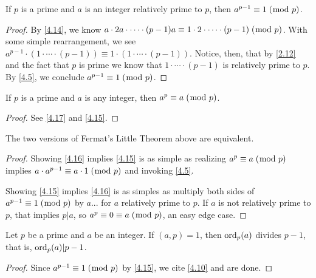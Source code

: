 \documentclass[../main.tex]{subfiles}
\begin{document}
\begin{thm} \label{4.15}
  If $p$ is a prime and $a$ is an integer relatively prime to $p$, then $a^{p-1} \equiv 1 \; (\bmod \; p)$.
\end{thm}

\begin{proof}
  By \ref{4.14}, we know $a \cdot 2a \cdot \cdots \cdot (p-1)a \equiv 1 \cdot 2 \cdot \cdots \cdot (p-1) \; (\bmod \; p)$. With some simple rearrangement, we see $a^{p-1} \cdot (1 \cdot \cdots \cdot (p-1)) \equiv 1 \cdot (1 \cdot \cdots \cdot (p-1))$.
  Notice, then, that by \ref{2.12} and the fact that $p$ is prime we know that $1 \cdot \cdots \cdot (p-1)$ is relatively prime to $p$. By \ref{4.5}, we conclude $a^{p-1} \equiv 1 \; (\bmod \; p)$.
\end{proof}



\begin{thm} \label{4.16}
  If $p$ is a prime and $a$ is any integer, then $a^p \equiv a \; (\bmod \; p)$.
\end{thm}

\begin{proof}
  See \ref{4.17} and \ref{4.15}.
\end{proof}



\pagebreak



\begin{thm} \label{4.17}
  The two versions of Fermat's Little Theorem above are equivalent.
\end{thm}

\begin{proof}
  Showing \ref{4.16} implies \ref{4.15} is as simple as realizing $a^p \equiv a \; (\bmod \; p)$ implies $a \cdot a^{p-1} \equiv a \cdot 1 \; (\bmod \; p)$ and invoking \ref{4.5}.

  Showing \ref{4.15} implies \ref{4.16} is as simples as multiply both sides of $a^{p-1} \equiv 1 \; (\bmod \; p)$ by $a$... for $a$ relatively prime to $p$. If $a$ is not relatively prime to $p$, that implies $p | a$, so $a^p \equiv 0 \equiv a \; (\bmod \; p)$, an easy edge case.
\end{proof}



\begin{thm} \label{4.18}
  Let $p$ be a prime and $a$ be an integer. If $(a, p) = 1$, then $\operatorname{ord}_p (a)$ divides $p-1$, that is, $\operatorname{ord}_p(a) | p-1$.
\end{thm}

\begin{proof}
  Since $a^{p-1} \equiv 1 \; (\bmod \; p)$ by \ref{4.15}, we cite \ref{4.10} and are done.
\end{proof}
\end{document}
